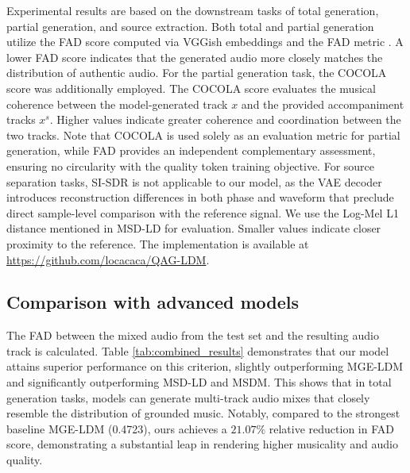 \documentclass[lettersize,journal]{IEEEtran}
\begin{document}
Experimental results are based on the downstream tasks of total generation, partial generation, and source extraction. Both total and partial generation utilize the FAD score computed via VGGish embeddings \cite{hershey2017cnn} and the FAD metric \cite{kilgour2018fr}. A lower FAD score indicates that the generated audio more closely matches the distribution of authentic audio. For the partial generation task, the COCOLA score was additionally employed. 
The COCOLA score evaluates the musical coherence between the model-generated track $x$ and the provided accompaniment tracks $x^{s}$. Higher values indicate greater coherence and coordination between the two tracks. Note that COCOLA is used solely as an evaluation metric for partial generation, while FAD provides an independent complementary assessment, ensuring no circularity with the quality token training objective. For source separation tasks, SI-SDR\cite{le2019sdr} is not applicable to our model, as the VAE decoder introduces reconstruction differences in both phase and waveform that preclude direct sample-level comparison with the reference signal. We use the Log-Mel L1 distance mentioned in MSD-LD \cite{karchkhadze2025simultaneous} for evaluation. Smaller values indicate closer proximity to the reference. The implementation is available at \url{https://github.com/locacaca/QAG-LDM}.


\subsection{Comparison with advanced models}
The FAD between the mixed audio from the test set and the resulting audio track is calculated. Table \ref{tab:combined_results} demonstrates that our model attains superior performance on this criterion, slightly outperforming MGE-LDM and significantly outperforming MSD-LD and MSDM. This shows that in total generation tasks, models can generate multi-track audio mixes that closely resemble the distribution of grounded music. Notably, compared to the strongest baseline MGE-LDM (0.4723), ours achieves a $21.07\%$ relative reduction in FAD score, demonstrating a substantial leap in rendering higher musicality and audio quality.
\end{document}
